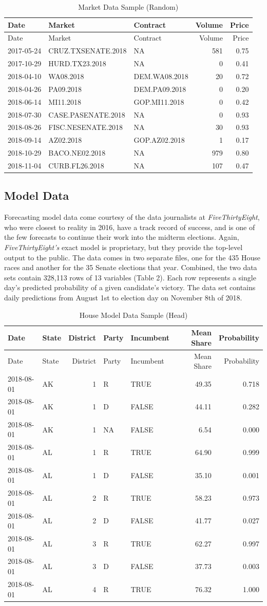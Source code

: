 \documentclass[11pt,]{article}
\begin{document}
\begin{longtable}[]{@{}lllrr@{}}
\caption{Market Data Sample (Random)}\tabularnewline
\toprule
Date & Market & Contract & Volume & Price\tabularnewline
\midrule
\endfirsthead
\toprule
Date & Market & Contract & Volume & Price\tabularnewline
\midrule
\endhead
2017-05-24 & CRUZ.TXSENATE.2018 & NA & 581 & 0.75\tabularnewline
2017-10-29 & HURD.TX23.2018 & NA & 0 & 0.41\tabularnewline
2018-04-10 & WA08.2018 & DEM.WA08.2018 & 20 & 0.72\tabularnewline
2018-04-26 & PA09.2018 & DEM.PA09.2018 & 0 & 0.20\tabularnewline
2018-06-14 & MI11.2018 & GOP.MI11.2018 & 0 & 0.42\tabularnewline
2018-07-30 & CASE.PASENATE.2018 & NA & 0 & 0.93\tabularnewline
2018-08-26 & FISC.NESENATE.2018 & NA & 30 & 0.93\tabularnewline
2018-09-14 & AZ02.2018 & GOP.AZ02.2018 & 1 & 0.17\tabularnewline
2018-10-29 & BACO.NE02.2018 & NA & 979 & 0.80\tabularnewline
2018-11-04 & CURB.FL26.2018 & NA & 107 & 0.47\tabularnewline
\bottomrule
\end{longtable}

\hypertarget{model-data}{%
\subsection{Model Data}\label{model-data}}

Forecasting model data come courtesy of the data journalists at
\emph{FiveThirtyEight}, who were closest to reality in 2016, have a
track record of success, and is one of the few forecasts to continue
their work into the midterm elections. Again, \emph{FiveThirtyEight's}
exact model is proprietary, but they provide the top-level output to the
public. The data comes in two separate files, one for the 435 House
races and another for the 35 Senate elections that year. Combined, the
two data sets contain 328,113 rows of 13 variables (Table 2). Each row
represents a single day's predicted probability of a given candidate's
victory. The data set contains daily predictions from August 1st to
election day on November 8th of 2018.

\begin{longtable}[]{@{}llrllrr@{}}
\caption{House Model Data Sample (Head)}\tabularnewline
\toprule
Date & State & District & Party & Incumbent & Mean Share &
Probability\tabularnewline
\midrule
\endfirsthead
\toprule
Date & State & District & Party & Incumbent & Mean Share &
Probability\tabularnewline
\midrule
\endhead
2018-08-01 & AK & 1 & R & TRUE & 49.35 & 0.718\tabularnewline
2018-08-01 & AK & 1 & D & FALSE & 44.11 & 0.282\tabularnewline
2018-08-01 & AK & 1 & NA & FALSE & 6.54 & 0.000\tabularnewline
2018-08-01 & AL & 1 & R & TRUE & 64.90 & 0.999\tabularnewline
2018-08-01 & AL & 1 & D & FALSE & 35.10 & 0.001\tabularnewline
2018-08-01 & AL & 2 & R & TRUE & 58.23 & 0.973\tabularnewline
2018-08-01 & AL & 2 & D & FALSE & 41.77 & 0.027\tabularnewline
2018-08-01 & AL & 3 & R & TRUE & 62.27 & 0.997\tabularnewline
2018-08-01 & AL & 3 & D & FALSE & 37.73 & 0.003\tabularnewline
2018-08-01 & AL & 4 & R & TRUE & 76.32 & 1.000\tabularnewline
\bottomrule
\end{longtable}
\end{document}

